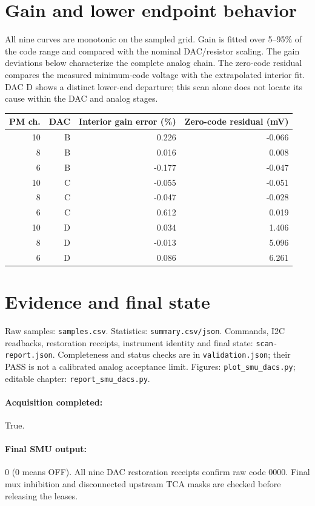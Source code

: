 \documentclass[a4paper,11pt]{article}
\begin{document}
\section{Gain and lower endpoint behavior}
All nine curves are monotonic on the sampled grid. Gain is fitted over
5--95\% of the code range and compared with the nominal DAC/resistor scaling.
The gain deviations below characterize the complete analog chain.
The zero-code residual compares the measured minimum-code voltage with the
extrapolated interior fit. DAC D shows a distinct lower-end departure;
this scan alone does not locate its cause within the DAC and analog stages.
\begin{center}\begin{tabular}{rr rr}\toprule
PM ch. & DAC & Interior gain error (\%) & Zero-code residual (mV)\\\midrule
10 & B & 0.226 & -0.066 \\
8 & B & 0.016 & 0.008 \\
6 & B & -0.177 & -0.047 \\
10 & C & -0.055 & -0.051 \\
8 & C & -0.047 & -0.028 \\
6 & C & 0.612 & 0.019 \\
10 & D & 0.034 & 1.406 \\
8 & D & -0.013 & 5.096 \\
6 & D & 0.086 & 6.261 \\
\bottomrule\end{tabular}\end{center}
\section{Evidence and final state}
Raw samples: \texttt{samples.csv}. Statistics: \texttt{summary.csv/json}.
Commands, I2C readbacks, restoration receipts, instrument identity and final
state: \texttt{scan-report.json}. Completeness and status checks are in
\texttt{validation.json}; their PASS is not a calibrated analog acceptance limit.
Figures: \texttt{plot\_smu\_dacs.py}; editable chapter:
\texttt{report\_smu\_dacs.py}.
\paragraph{Acquisition completed:} True.
\paragraph{Final SMU output:} 0 (0 means OFF).
All nine DAC restoration receipts confirm raw code 0000. Final mux inhibition
and disconnected upstream TCA masks are checked before releasing the leases.
\end{document}
